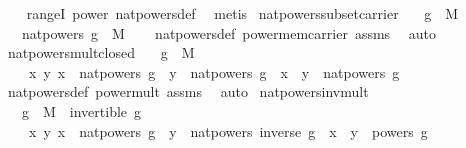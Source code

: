 \begin{isabellebody}
%
\isadelimproof
\ \ %
\endisadelimproof
%
\isatagproof
{}\isamarkupfalse%
\ rangeI\ power{}\ nat{\isacharunderscore}{\kern0pt}powers{\isacharunderscore}{\kern0pt}def\ \isamarkupfalse%
\ metis%
\endisatagproof
{\isafoldproof}%
%
\isadelimproof
\isanewline
%
\endisadelimproof
\isanewline
{}\isamarkupfalse%
\ nat{\isacharunderscore}{\kern0pt}powers{\isacharunderscore}{\kern0pt}subset{\isacharunderscore}{\kern0pt}carrier{\isacharcolon}{\kern0pt}\isanewline
\ \ \ {\isachardoublequoteopen}g\ {\isasymin}\ M{\isachardoublequoteclose}\isanewline
\ \ \ {\isachardoublequoteopen}nat{\isacharunderscore}{\kern0pt}powers\ g\ {\isasymsubseteq}\ M{\isachardoublequoteclose}\isanewline
%
\isadelimproof
\ \ %
\endisadelimproof
%
\isatagproof
{}\isamarkupfalse%
\ nat{\isacharunderscore}{\kern0pt}powers{\isacharunderscore}{\kern0pt}def\ power{\isacharunderscore}{\kern0pt}mem{\isacharunderscore}{\kern0pt}carrier\ assms\ \isamarkupfalse%
\ auto%
\endisatagproof
{\isafoldproof}%
%
\isadelimproof
\isanewline
%
\endisadelimproof
\isanewline
{}\isamarkupfalse%
\ nat{\isacharunderscore}{\kern0pt}powers{\isacharunderscore}{\kern0pt}mult{\isacharunderscore}{\kern0pt}closed{\isacharcolon}{\kern0pt}\isanewline
\ \ \ {\isachardoublequoteopen}g\ {\isasymin}\ M{\isachardoublequoteclose}\isanewline
\ \ \ {\isachardoublequoteopen}{\isasymAnd}\ x\ y{\isachardot}{\kern0pt}\ x\ {\isasymin}\ nat{\isacharunderscore}{\kern0pt}powers\ g\ {\isasymLongrightarrow}\ y\ {\isasymin}\ nat{\isacharunderscore}{\kern0pt}powers\ g\ {\isasymLongrightarrow}\ x\ {\isasymcdot}\ y\ {\isasymin}\ nat{\isacharunderscore}{\kern0pt}powers\ g{\isachardoublequoteclose}\isanewline
%
\isadelimproof
\ \ %
\endisadelimproof
%
\isatagproof
{}\isamarkupfalse%
\ nat{\isacharunderscore}{\kern0pt}powers{\isacharunderscore}{\kern0pt}def\ power{\isacharunderscore}{\kern0pt}mult\ assms\ \isamarkupfalse%
\ auto%
\endisatagproof
{\isafoldproof}%
%
\isadelimproof
\isanewline
%
\endisadelimproof
\isanewline
{}\isamarkupfalse%
\ nat{\isacharunderscore}{\kern0pt}powers{\isacharunderscore}{\kern0pt}inv{\isacharunderscore}{\kern0pt}mult{\isacharcolon}{\kern0pt}\isanewline
\ \ \ {\isachardoublequoteopen}g\ {\isasymin}\ M{\isachardoublequoteclose}\ \ {\isachardoublequoteopen}invertible\ g{\isachardoublequoteclose}\isanewline
\ \ \ {\isachardoublequoteopen}{\isasymAnd}\ x\ y{\isachardot}{\kern0pt}\ x\ {\isasymin}\ nat{\isacharunderscore}{\kern0pt}powers\ g\ {\isasymLongrightarrow}\ y\ {\isasymin}\ nat{\isacharunderscore}{\kern0pt}powers\ {\isacharparenleft}{\kern0pt}inverse\ g{\isacharparenright}{\kern0pt}\ {\isasymLongrightarrow}\ x\ {\isasymcdot}\ y\ {\isasymin}\ powers\ g{\isachardoublequoteclose}\isanewline

\end{isabellebody}
